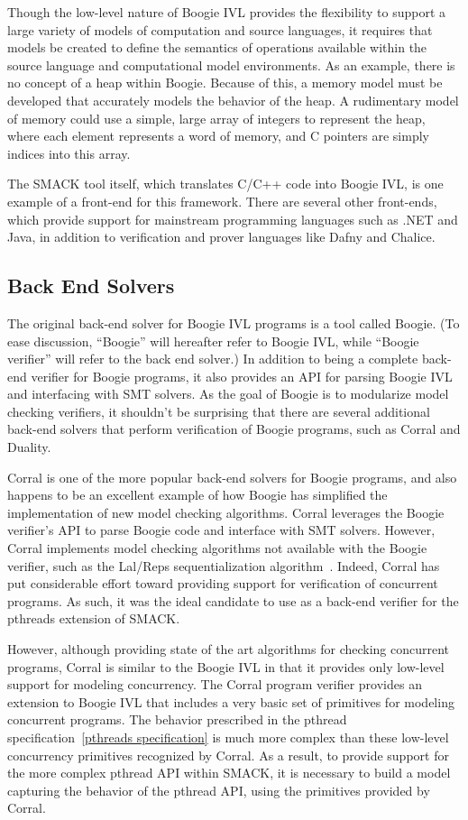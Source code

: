 Though the low-level nature of Boogie IVL provides the flexibility to
support a large variety of models of computation and source languages,
it requires that models be created to define the semantics of
operations available within the source language and computational
model environments.  As an example, there is no concept of a heap
within Boogie.  Because of this, a memory model must be developed that
accurately models the behavior of the heap.  A rudimentary model of
memory could use a simple, large array of integers to represent the
heap, where each element represents a word of memory, and C pointers
are simply indices into this array.

The SMACK tool itself, which translates C/C++ code into Boogie IVL, is
one example of a front-end for this framework.  There are several
other front-ends, which provide support for mainstream programming
languages such as .NET and Java, in addition to verification and
prover languages like Dafny and Chalice.

\subsection {Back End Solvers}
The original back-end solver for Boogie IVL programs is a tool called
Boogie.  (To ease discussion, ``Boogie'' will hereafter refer to
Boogie IVL, while ``Boogie verifier'' will refer to the back end
solver.)  In addition to being a complete back-end verifier for Boogie
programs, it also provides an API for parsing Boogie IVL and 
interfacing with SMT solvers. As the goal of Boogie is to modularize
model checking verifiers, it shouldn't be surprising that there are
several additional back-end solvers that perform verification of
Boogie programs, such as Corral and Duality.  

Corral is one of the more popular back-end solvers for Boogie
programs, and also happens to be an excellent example of how Boogie
has simplified the implementation of new model checking algorithms.
Corral leverages the Boogie verifier's API to parse Boogie code and
interface with SMT solvers.  However, Corral implements model checking
algorithms not available with the Boogie verifier, such as the
Lal/Reps sequentialization algorithm~\cite{Reducing Concurrent
  Analysis Under}. Indeed, Corral has put considerable effort toward
providing support for verification of concurrent programs.  As such,
it was the ideal candidate to use as a back-end verifier for the
pthreads extension of SMACK.

However, although providing state of the art algorithms for checking
concurrent programs, Corral is similar to the Boogie IVL in that it
provides only low-level support for modeling concurrency.  The Corral
program verifier provides an extension to Boogie IVL that includes a
very basic set of primitives for modeling concurrent programs.  The
behavior prescribed in the pthread specification~\ref{pthreads
  specification} is much more complex than these low-level concurrency
primitives recognized by Corral.  As a result, to provide support for
the more complex pthread API within SMACK, it is necessary to build a
model  capturing the behavior of the pthread API, using the primitives
provided by Corral.


